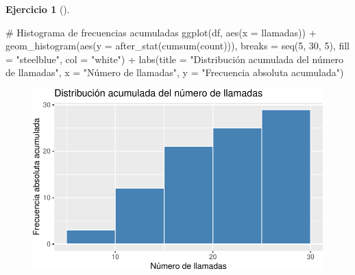 \documentclass[
  a4paper,
]{scrreport}
\newenvironment{Shaded}{\begin{snugshade}}{\end{snugshade}}
\newcommand{\AttributeTok}[1]{\textcolor[rgb]{0.40,0.45,0.13}{#1}}
\newcommand{\CommentTok}[1]{\textcolor[rgb]{0.37,0.37,0.37}{#1}}
\newcommand{\DecValTok}[1]{\textcolor[rgb]{0.68,0.00,0.00}{#1}}
\newcommand{\FunctionTok}[1]{\textcolor[rgb]{0.28,0.35,0.67}{#1}}
\newcommand{\NormalTok}[1]{\textcolor[rgb]{0.00,0.23,0.31}{#1}}
\newcommand{\SpecialCharTok}[1]{\textcolor[rgb]{0.37,0.37,0.37}{#1}}
\newcommand{\StringTok}[1]{\textcolor[rgb]{0.13,0.47,0.30}{#1}}
\theoremstyle{definition}
\newtheorem{exercise}{Ejercicio}[chapter]
\theoremstyle{remark}
\begin{document}
\begin{exercise}[]
\begin{enumerate}
\begin{tcolorbox}
\begin{Shaded}
\begin{Highlighting}[]
\CommentTok{\# Histograma de frecuencias acumuladas}
\FunctionTok{ggplot}\NormalTok{(df, }\FunctionTok{aes}\NormalTok{(}\AttributeTok{x =}\NormalTok{ llamadas)) }\SpecialCharTok{+}
    \FunctionTok{geom\_histogram}\NormalTok{(}\FunctionTok{aes}\NormalTok{(}\AttributeTok{y =} \FunctionTok{after\_stat}\NormalTok{(}\FunctionTok{cumsum}\NormalTok{(count))), }\AttributeTok{breaks =} \FunctionTok{seq}\NormalTok{(}\DecValTok{5}\NormalTok{, }\DecValTok{30}\NormalTok{, }\DecValTok{5}\NormalTok{), }\AttributeTok{fill =} \StringTok{"steelblue"}\NormalTok{, }\AttributeTok{col =} \StringTok{"white"}\NormalTok{) }\SpecialCharTok{+}
    \FunctionTok{labs}\NormalTok{(}\AttributeTok{title =} \StringTok{"Distribución acumulada del número de llamadas"}\NormalTok{, }\AttributeTok{x =} \StringTok{"Número de llamadas"}\NormalTok{, }\AttributeTok{y =} \StringTok{"Frecuencia absoluta acumulada"}\NormalTok{)}
\end{Highlighting}
\end{Shaded}

  \begin{figure}[H]

  {\centering \includegraphics{03-frecuencias-graficos_files/figure-pdf/unnamed-chunk-19-3.pdf}

  }

  \end{figure}


\end{tcolorbox}
\end{enumerate}
\end{exercise}
\end{document}
